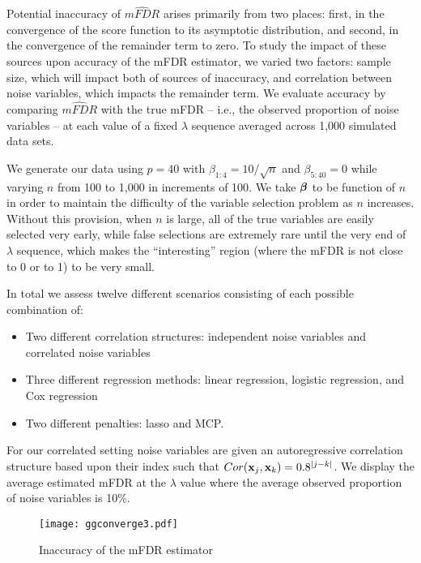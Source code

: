 Potential inaccuracy of $\widehat{mFDR}$ arises primarily from two places: first, in the convergence of the score function to its asymptotic distribution, and second, in the convergence of the remainder term to zero. To study the impact of these sources upon accuracy of the mFDR estimator, we varied two factors: sample size, which will impact both of sources of inaccuracy, and correlation between noise variables, which impacts the remainder term. We evaluate accuracy by comparing $\widehat{mFDR}$ with the true mFDR -- i.e., the observed proportion of noise variables -- at each value of a fixed $\lambda$ sequence averaged across 1,000 simulated data sets.


We generate our data using $p = 40$ with $\beta_{1:4} = 10/\sqrt{n}$ and $\beta_{5:40} = 0$ while varying $n$ from 100 to 1,000 in increments of 100. We take $\boldsymbol{\beta}$ to be function of $n$ in order to maintain the difficulty of the variable selection problem as $n$ increases.  Without this provision, when $n$ is large, all of the true variables are easily selected very early, while false selections are extremely rare until the very end of $\lambda$ sequence, which makes the ``interesting'' region (where the mFDR is not close to 0 or to 1) to be very small.

In total we assess twelve different scenarios consisting of each possible combination of:
\begin{itemize}
\item Two different correlation structures: independent noise variables and correlated noise variables
\item Three different regression methods: linear regression, logistic regression, and Cox regression
\item Two different penalties: lasso and MCP. 
\end{itemize}
For our correlated setting noise variables are given an autoregressive correlation structure based upon their index such that $Cor(\mathbf{x}_j,\mathbf{x}_k) = 0.8^{|j - k|}$. We display the average estimated mFDR at the $\lambda$ value where the average observed proportion of noise variables is 10\%.

\begin{figure} [!htb]
 \centering
  \texttt{[image: ggconverge3.pdf]}
  \caption{Inaccuracy of the mFDR estimator}
\end{figure}

